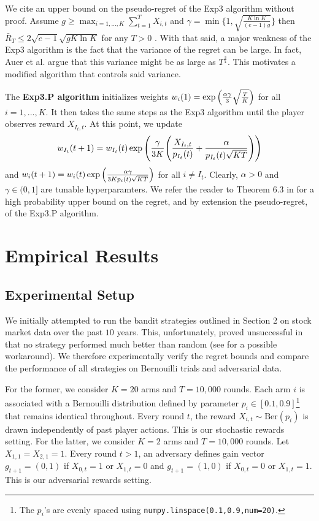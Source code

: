 \documentclass[12pt]{article}
\begin{document}
We cite an upper bound on the pseudo-regret of the Exp3 algorithm without proof. Assume $g\geq\max_{i=1,...,K}\sum_{t=1}^{T}X_{i,t}$ and $\gamma=\min\{1,\sqrt{\frac{K\ln K}{(e-1)g}}\}$ then $\bar{R}_{T}\leq 2\sqrt{e-1}\sqrt{gK\ln K}$ for any $T>0$ \cite{auer2003}. With that said, a major weakness of the Exp3 algorithm is the fact that the variance of the regret can be large. In fact, Auer et al. argue that this variance might be as large as $T^{\frac{3}{4}}$. This motivates a modified algorithm that controls said variance.

The \textbf{Exp3.P algorithm} initializes weights $w_{i}(1)=\exp\Big{(}\frac{\alpha\gamma}{3}\sqrt{\frac{T}{K}}\Big{)}$ for all $i=1,...,K$. It then takes the same steps as the Exp3 algorithm until the player observes reward $X_{I_{t},t}$. At this point, we update
\begin{align}
w_{I_{t}}(t+1)=w_{I_{t}}(t)\exp\Bigg{(}\frac{\gamma}{3K}\Bigg{(}\frac{X_{I_{t},t}}{p_{I_{t}}(t)}+\frac{\alpha}{p_{I_{t}}(t)\sqrt{KT}}\Bigg{)}\Bigg{)}
\end{align}
and $w_{i}(t+1)=w_{i}(t)\exp\Big{(}\frac{\alpha\gamma}{3K p_{i}(t)\sqrt{KT}}\Big{)}$ for all $i\neq I_{t}$. Clearly, $\alpha>0$ and $\gamma\in(0,1]$ are tunable hyperparamters. We refer the reader to Theorem 6.3 in \cite{auer2003} for a high probability upper bound on the regret, and by extension the pseudo-regret, of the Exp3.P algorithm.

\section{Empirical Results}

\subsection{Experimental Setup}

We initially attempted to run the bandit strategies outlined in Section 2 on stock market data over the past $10$ years. This, unfortunately, proved unsuccessful in that no strategy performed much better than random (see \cite{shen2015} for a possible workaround). We therefore experimentally verify the regret bounds and compare the performance of all strategies on Bernouilli trials and adversarial data.

For the former, we consider $K=20$ arms and $T=10,000$ rounds. Each arm $i$ is associated with a Bernouilli distribution defined by parameter $p_{i}\in[0.1,0.9]$\footnote{The $p_{i}$'s are evenly spaced using \texttt{numpy.linspace(0.1,0.9,num=20)}.} that remains identical throughout. Every round $t$, the reward $X_{i,t}\sim\text{Ber}(p_{i})$ is drawn independently of past player actions. This is our stochastic rewards setting. For the latter, we consider $K=2$ arms and $T=10,000$ rounds. Let $X_{1,1}=X_{2,1}=1$. Every round $t>1$, an adversary defines gain vector $g_{t+1}=(0,1)$ if $X_{0,t}=1$ or $X_{1,t}=0$ and $g_{t+1}=(1,0)$ if $X_{0,t}=0$ or $X_{1,t}=1$. This is our adversarial rewards setting.
\end{document}
